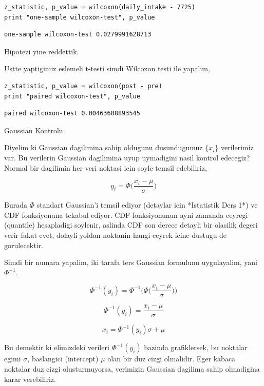 \documentclass[12pt,fleqn]{article}\usepackage{../common}
\begin{document}
\begin{verbatim}
z_statistic, p_value = wilcoxon(daily_intake - 7725)
print "one-sample wilcoxon-test", p_value
\end{verbatim}

\begin{verbatim}
one-sample wilcoxon-test 0.0279991628713
\end{verbatim}

Hipotezi yine reddettik.

Ustte yaptigimiz eslemeli t-testi simdi Wilcoxon testi ile yapalim,

\begin{verbatim}
z_statistic, p_value = wilcoxon(post - pre)
print "paired wilcoxon-test", p_value
\end{verbatim}

\begin{verbatim}
paired wilcoxon-test 0.00463608893545
\end{verbatim}

Gaussian Kontrolu

Diyelim ki Gaussian dagilimina sahip oldugunu dusundugumuz $\{ x_i\}$
verilerimiz var. Bu verilerin Gaussian dagilimina uyup uymadigini nasil
kontrol edecegiz? Normal bir dagilimin her veri noktasi icin soyle temsil
edebiliriz,

$$ y_i = \Phi\bigg(\frac{ x_i - \mu}{\sigma}\bigg) $$

Burada $\Phi$ standart Gaussian'i temsil ediyor (detaylar icin
*Istatistik Ders 1*) ve CDF fonksiyonuna tekabul ediyor. CDF
fonksiyonunun ayni zamanda ceyregi (quantile) hesapladigi soylenir,
aslinda CDF son derece detayli bir olasilik degeri verir fakat evet,
dolayli yoldan noktanin hangi ceyrek icine dustugu de gorulecektir.

Simdi bir numara yapalim, iki tarafa ters Gaussian formulunu uygulayalim,
yani $\Phi^{-1}$.

$$ \Phi^{-1}(y_i) = \Phi^{-1}\bigg( \Phi\bigg(\frac{ x_i - \mu}{\sigma}\bigg)\bigg) $$

$$ \Phi^{-1}(y_i) = \frac{ x_i - \mu}{\sigma}$$

$$ x_i = \Phi^{-1}(y_i) \sigma + \mu  $$ 

Bu demektir ki elimizdeki verileri $\Phi^{-1}(y_i)$ bazinda grafiklersek,
bu noktalar egimi $\sigma$, baslangici (intercept) $\mu$ olan bir duz cizgi
olmalidir. Eger kabaca noktalar duz cizgi olusturmuyorsa, verimizin 
Gaussian dagilima sahip olmadigina karar verebiliriz. 
\end{document}
